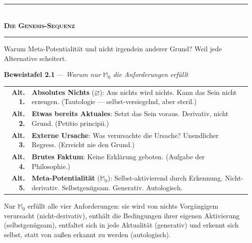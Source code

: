 \documentclass[10pt, openany, oneside]{book}
\renewcommand{\normalsize}{\fontsize{10}{13}\selectfont}
\begin{document}
\vspace{1.5em}


\begin{center}
    \rule{0.3\textwidth}{0.4pt}\\[0.5em]
    {\normalsize\bfseries\scshape Die Genesis-Sequenz}\\[0.3em]
    \rule{0.3\textwidth}{0.4pt}
\end{center}

\vspace{1em}

\noindent Warum Meta-Potentialität und nicht irgendein anderer Grund? Weil jede Alternative scheitert.

\vspace{0.5em}

\textbf{Beweistafel 2.1} --- \textit{Warum nur $\mathbb{M}_0$ die Anforderungen erfüllt}

\vspace{0.5em}

\noindent\begin{tabular}{r p{}}
\textbf{Alt. 1.} & \textbf{Absolutes Nichts} ($\varnothing$): Aus nichts wird nichts. Kann das Sein nicht erzeugen. (Tautologie --- selbst-versiegelnd, aber steril.) \\[0.3em]
\textbf{Alt. 2.} & \textbf{Etwas bereits Aktuales}: Setzt das Sein voraus. Derivativ, nicht Grund. (Petitio principii.) \\[0.3em]
\textbf{Alt. 3.} & \textbf{Externe Ursache}: Was verursachte die Ursache? Unendlicher Regress. (Erreicht nie den Grund.) \\[0.3em]
\textbf{Alt. 4.} & \textbf{Brutes Faktum}: Keine Erklärung geboten. (Aufgabe der Philosophie.) \\[0.3em]
\textbf{Alt. 5.} & \textbf{Meta-Potentialität} ($\mathbb{M}_0$): Selbst-aktivierend durch Erkennung. Nicht-derivativ. Selbstgenügsam. Generativ. Autologisch. \\[0.3em]
\end{tabular}

\vspace{0.8em}

\noindent Nur $\mathbb{M}_0$ erfüllt alle vier Anforderungen: sie wird von nichts Vorgängigem verursacht (nicht-derivativ), enthält die Bedingungen ihrer eigenen Aktivierung (selbstgenügsam), entfaltet sich in jede Aktualität (generativ) und erkennt sich selbst, statt von außen erkannt zu werden (autologisch).
\end{document}
